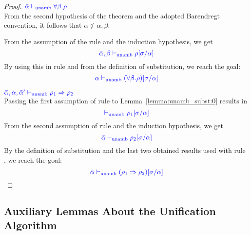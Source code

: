 \begin{proof}
\item[\fbox{\rref{UA-TAbs}}]\quad${\color{blue} \bar{\alpha} \vdash_{\mathrm{unamb}} \forall \beta. \rho}$\\

From the second hypothesis of the theorem and the adopted Barendregt convention, it follows that $\alpha\notin\bar\alpha,\beta$.

From the assumption of the rule and the induction hypothesis, we get
\begin{equation*}
{\color{blue} \bar{\alpha},\beta \vdash_{\mathrm{unamb}}\rho[\sigma/\alpha]}
\end{equation*}
By using this in rule  and from the definition of substitution, we reach the goal:
\begin{equation*}
{\color{blue} \bar{\alpha} \vdash_{\mathrm{unamb}}(\forall \beta. \rho)[\sigma/\alpha]}
\end{equation*}

\item[\fbox{\rref{UA-IAbs}}]\quad${\color{blue} \bar{\alpha},\alpha,\bar{\alpha}' \vdash_{\mathrm{unamb}} \rho_1\Rightarrow\rho_2}$\\

Passing the first assumption of rule  to Lemma~\ref{lemma:unamb_subst:0} results in
\begin{equation*}
{\color{blue}  \vdash_{\mathrm{unamb}}\rho_1[\sigma/\alpha]}
\end{equation*}
From the second assumption of rule  and the induction hypothesis, we get
\begin{equation*}
{\color{blue} \bar{\alpha} \vdash_{\mathrm{unamb}}\rho_2[\sigma/\alpha]}
\end{equation*}
By the definition of substitution and the last two obtained results used with rule
, we reach the goal:
\begin{equation*}
{\color{blue} \bar{\alpha} \vdash_{\mathrm{unamb}}(\rho_1\Rightarrow\rho_2)[\sigma/\alpha]}
\end{equation*}
\end{proof}

\subsection{Auxiliary Lemmas About the Unification Algorithm}

